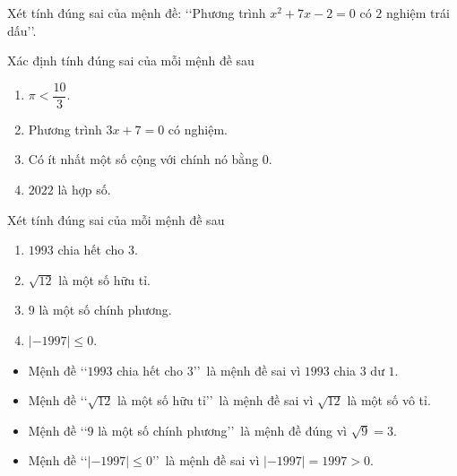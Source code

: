 \begin{bt}[Mức độ 2]%
	Xét tính đúng sai của mệnh đề: \lq\lq Phương trình $x^2+7x-2=0$ có $2$ nghiệm trái dấu\rq\rq.
\end{bt}

\begin{bt}%
	Xác định tính đúng sai của mỗi mệnh đề sau
	\begin{enumerate}
		\item $\pi<\dfrac{10}{3}$.
		\item Phương trình $3x+7=0$ có nghiệm.
		\item Có ít nhất một số cộng với chính nó bằng $0$.
		\item $2022$ là hợp số.
	\end{enumerate}
\end{bt}

\begin{bt}%
	Xét tính đúng sai của mỗi mệnh đề sau
	\begin{enumerate}
		\item $1993$ chia hết cho $3$.
		\item $\sqrt{12}$ là một số hữu tỉ.
		\item $9$ là một số chính phương.
		\item $|-1997|\leqslant0$.
	\end{enumerate}
	\loigiai
	{
		\begin{itemize}
			\item Mệnh đề \lq\lq $1993$ chia hết cho $3$\rq\rq\ là mệnh đề sai vì $1993$ chia $3$ dư $1$.
			\item Mệnh đề \lq\lq $\sqrt{12}$ là một số hữu tỉ\rq\rq\ là mệnh đề sai vì $\sqrt{12}$ là một số vô tỉ.
			\item Mệnh đề \lq\lq $9$ là một số chính phương\rq\rq\ là mệnh đề đúng vì $\sqrt{9}=3$.
			\item Mệnh đề \lq\lq $|-1997|\leqslant0$\rq\rq\ là mệnh đề sai vì $|-1997|=1997>0$.
		\end{itemize}
	}
\end{bt}

